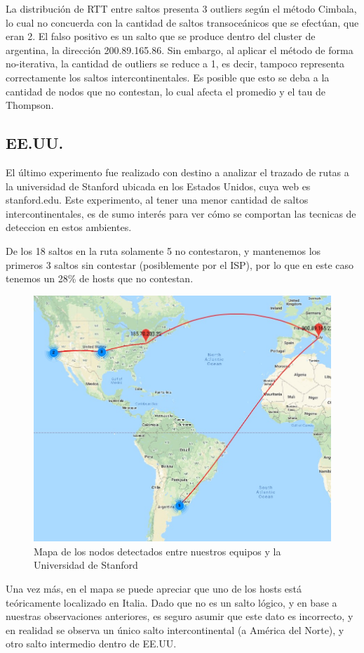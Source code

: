 La distribución de RTT entre saltos presenta 3 outliers según el método Cimbala, lo cual no concuerda con la cantidad de saltos transoceánicos que se efectúan, que eran 2. El falso positivo es un salto que se produce dentro del cluster de argentina, la dirección 200.89.165.86. Sin embargo, al aplicar el método de forma no-iterativa, la cantidad de outliers se reduce a 1, es decir, tampoco representa correctamente los saltos intercontinentales. Es posible que esto se deba a la cantidad de nodos que no contestan, lo cual afecta el promedio y el tau de Thompson.

\subsection{EE.UU.}

El último experimento fue realizado con destino a analizar el trazado de rutas a la universidad de Stanford ubicada en los Estados Unidos, cuya web es stanford.edu. Este experimento, al tener una menor cantidad de saltos intercontinentales, es de sumo interés para ver cómo se comportan las tecnicas de deteccion en estos ambientes.

De los 18 saltos en la ruta solamente 5 no contestaron, y mantenemos los primeros 3 saltos sin contestar (posiblemente por el ISP), por lo que en este caso tenemos un 28\% de hosts que no contestan.

\begin{figure}[H]
	\centering
	\includegraphics[width=.5\linewidth]{stanford_mapa.jpg}
	\captionsetup{justification=centering}
	\caption{Mapa de los nodos detectados entre nuestros equipos y la Universidad de Stanford}
\end{figure}

Una vez más, en el mapa se puede apreciar que uno de los hosts está teóricamente localizado en Italia. Dado que no es un salto lógico, y en base a nuestras observaciones anteriores, es seguro asumir que este dato es incorrecto, y en realidad se observa un único salto intercontinental (a América del Norte), y otro salto intermedio dentro de EE.UU. 

